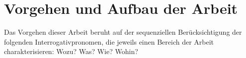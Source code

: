 \section{Vorgehen und Aufbau der Arbeit}
Das Vorgehen dieser Arbeit beruht auf der sequenziellen Berücksichtigung der folgenden Interrogativpronomen, die jeweils einen Bereich der Arbeit charakterisieren: Wozu? Was? Wie? Wohin?

